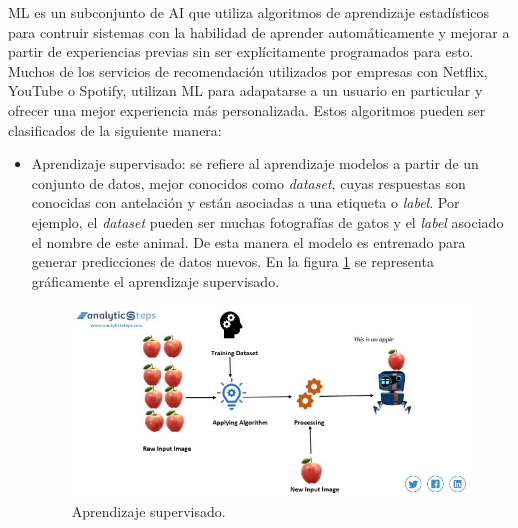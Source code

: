 ML es un subconjunto de AI que utiliza algoritmos de aprendizaje estadísticos para contruir sistemas con la habilidad de aprender automáticamente y mejorar a partir de experiencias previas sin ser explícitamente programados para esto. Muchos de los servicios de recomendación utilizados por empresas con Netflix, YouTube o Spotify, utilizan ML para adapatarse a un usuario en particular y ofrecer una mejor experiencia más personalizada. Estos algoritmos pueden ser clasificados de la siguiente manera:
\begin{itemize}
	\item Aprendizaje supervisado: se refiere al aprendizaje modelos a partir de un conjunto de datos, mejor conocidos como \textit{dataset}, cuyas respuestas son conocidas con antelación y están asociadas a una etiqueta o \textit{label}. Por ejemplo, el \textit{dataset} pueden ser muchas fotografías de gatos y el \textit{label} asociado el nombre de este animal. De esta manera el modelo es entrenado para generar predicciones de datos nuevos. En la figura \ref{fig:ml_sl} se representa gráficamente el aprendizaje supervisado.
	\begin{figure}[h]
		\centering
		\includegraphics[scale=0.4]{./Figures/ml_sl.jpg}
		\caption{Aprendizaje supervisado.}
		\label{fig:ml_sl}
	\end{figure}
	

\end{itemize}
